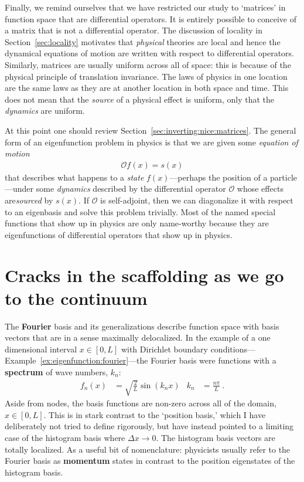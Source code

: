 \documentclass[12pt, oneside]{report}    %
\let\oldsection\section
\def\section{%
  \setcounter{sidenote}{1}%
  \oldsection
}
\begin{document}
Finally, we remind ourselves that we have restricted our study to `matrices' in function space that are differential operators. It is entirely possible to conceive of a matrix that is not a differential operator. The discussion of locality in Section~\ref{sec:locality} motivates that \emph{physical} theories are local and hence the dynamical equations of motion are written with respect to differential operators. Similarly, matrices are usually uniform across all of space: this is because of the physical principle of translation invariance. The laws of physics in one location are the same laws as they are at another location in both space and time. This does not mean that the \emph{source} of a physical effect is uniform, only that the \emph{dynamics} are uniform. 

At this point one should review Section~\ref{sec:inverting:nice:matrices}. The general form of an eigenfunction problem in physics is that we are given some \emph{equation of motion}
\begin{align}
    \mathcal O f(x) = s(x) 
\end{align}
that describes what happens to a \emph{state} $f(x)$---perhaps the position of a particle---under some \emph{dynamics} described by the differential operator $\mathcal O$ whose effects are\emph{sourced} by $s(x)$. If $\mathcal O$ is self-adjoint, then we can diagonalize it with respect to an eigenbasis and solve this problem trivially. Most of the named special functions that show up in physics are only name-worthy because they are eigenfunctions of differential operators that show up in physics.





\section{Cracks in the scaffolding as we go to the continuum}

The \textbf{Fourier} basis and its generalizations describe function space with basis vectors that are in a sense maximally delocalized. In the example of a one dimensional interval $x\in[0,L]$ with Dirichlet boundary conditions---Example~\ref{ex:eigenfunction:fourier}---the Fourier basis were functions with a \textbf{spectrum} of wave numbers, $k_n$:
\begin{align}
    f_n(x) &= \sqrt{\frac{2}{L}} \sin(k_nx)
    &
    k_n &= \frac{n\pi}{L} \ .
    \label{eq:example:of:fourier:basis}
\end{align}
Aside from nodes, the basis functions are non-zero across all of the domain, $x\in [0,L]$. This is in stark contrast to the `position basis,' which I have deliberately not tried to define rigorously, but have instead pointed to a limiting case of the histogram basis where $\Delta x \to 0$. The histogram basis vectors are totally localized. As a useful bit of nomenclature: physicists usually refer to the Fourier basis as \textbf{momentum} states in contrast to the position eigenstates of the histogram basis. 
\end{document}
